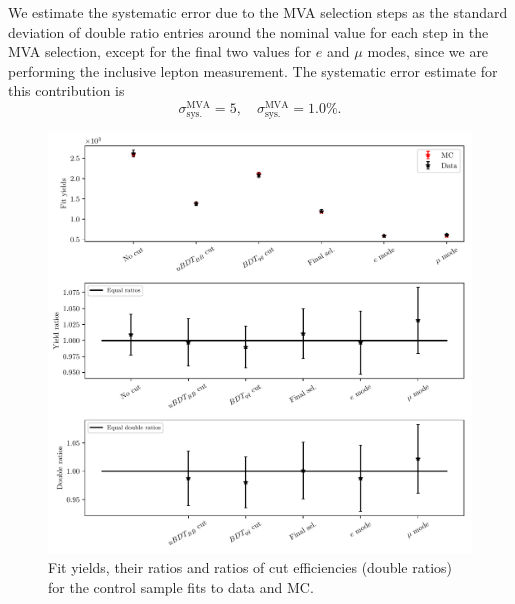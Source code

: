 We estimate the systematic error due to the MVA selection steps as the standard deviation of double ratio entries around the nominal value for each step in the MVA selection, except for the final two values for $e$ and $\mu$ modes, since we are performing the inclusive lepton measurement. The systematic error estimate for this contribution is 
\begin{equation}
\sigma_{\mathrm{sys.}}^{\mathrm{MVA}} = 5,\quad\sigma_{\mathrm{sys.}}^{\mathrm{MVA}} = 1.0\%.
\end{equation}

\begin{figure}[H]
	\centering
	\captionsetup{width=0.8\linewidth}
	\includegraphics[width=\linewidth]{fig/cs_fits.pdf}
	\caption{Fit yields, their ratios and ratios of cut efficiencies (double ratios) for the control sample fits to data and MC.}
	\label{fig:cs_fits}
\end{figure}

